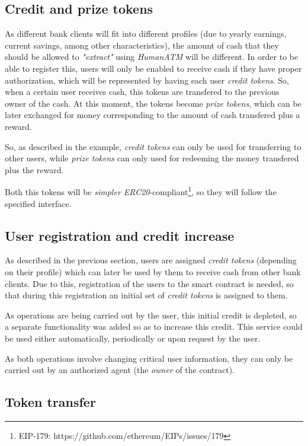 \documentclass[a4paper]{article}
\begin{document}
\subsection{Credit and prize tokens}

As different bank clients will fit into different profiles (due to yearly earnings, current savings, among other characteristics), the amount of cash that they should be allowed to \textit{"extract"} using \textit{HumanATM} will be different. In order to be able to register this, users will only be enabled to receive cash if they have proper authorization, which will be represented by having each user \textit{credit tokens}. So, when a certain user receives cash, this tokens are transfered to the previous owner of the cash. At this moment, the tokens become \textit{prize tokens}, which can be later exchanged for money corresponding to the amount of cash transfered plus a reward.

So, as described in the example, \textit{credit tokens} can only be used for transferring to other users, while \textit{prize tokens} can only used for redeeming the money transfered plus the reward.

Both this tokens will be \textit{simpler ERC20}-compliant\footnote{EIP-179: https://github.com/ethereum/EIPs/issues/179}, so they will follow the specified interface.

\subsection{User registration and credit increase}

As described in the previous section, users are assigned \textit{credit tokens} (depending on their profile) which can later be used by them to receive cash from other bank clients. Due to this, registration of the users to the smart contract is needed, so that during this registration an initial set of \textit{credit tokens} is assigned to them.

As operations are being carried out by the user, this initial credit is depleted, so a separate functionality was added so as to increase this credit. This service could be used either automatically, periodically or upon request by the user.

As both operations involve changing critical user information, they can only be carried out by an authorized agent (the \textit{owner} of the contract).

\subsection{Token transfer}
\end{document}
